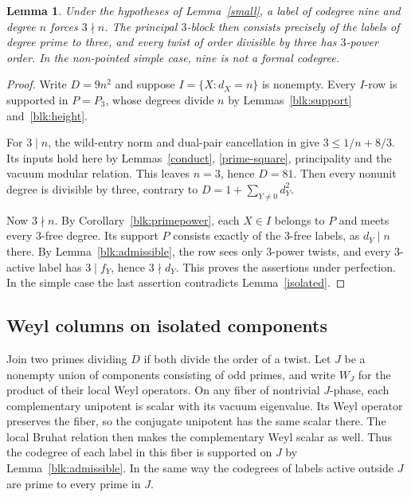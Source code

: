 \documentclass[11pt]{amsart}
\numberwithin{equation}{section}
\newtheorem{lemma}[theorem]{Lemma}
\theoremstyle{definition}
\theoremstyle{plain}
\begin{document}
\begin{lemma}\label{nine}
Under the hypotheses of Lemma~\ref{small}, a label of codegree nine and
degree $n$ forces $3\nmid n$. The principal $3$-block then consists
precisely of the labels of degree prime to three, and every twist of
order divisible by three has $3$-power order. In the non-pointed
simple case, nine is not a formal codegree.
\end{lemma}
\begin{proof}
Write $D=9n^2$ and suppose $I=\{X:d_X=n\}$ is nonempty. Every
$I$-row is supported in $P=P_3$, whose degrees divide $n$ by
Lemmas~\ref{blk:support} and~\ref{blk:height}.

For $3\mid n$, the wild-entry norm and dual-pair cancellation in
\cite[proof of Theorem~20.8, first paragraph]{BDPcore} give
$3\le 1/n+8/3$. Its inputs hold here by Lemmas~\ref{conduct},
\ref{prime-square}, principality and the vacuum modular relation.
This leaves $n=3$, hence $D=81$. Then every nonunit degree is
divisible by three, contrary to $D=1+\sum_{Y\ne0}d_Y^2$.

Now $3\nmid n$. By Corollary~\ref{blk:primepower}, each $X\in I$
belongs to $P$ and meets every $3$-free degree. Its support $P$ consists exactly of the $3$-free labels, as $d_Y\mid n$
there. By Lemma~\ref{blk:admissible}, the row sees only $3$-power
twists, and every $3$-active label has $3\mid f_Y$, hence $3\nmid d_Y$.
This proves the assertions under perfection. In the simple case the
last assertion contradicts Lemma~\ref{isolated}.
\end{proof}

\subsection{Weyl columns on isolated components}
Join two primes dividing $D$ if both divide the order of a twist.
Let $J$ be a nonempty union of components consisting of odd primes,
and write $W_J$ for the product of their local Weyl operators.
On any fiber of nontrivial $J$-phase, each complementary unipotent is
scalar with its vacuum eigenvalue. Its Weyl operator preserves the
fiber, so the conjugate unipotent has the same scalar there. The local
Bruhat relation then makes the complementary Weyl scalar as well.
Thus the codegree of each label in this fiber is supported on $J$
by Lemma~\ref{blk:admissible}. In the same way the codegrees of
labels active outside $J$ are prime to every prime in $J$.
\end{document}
